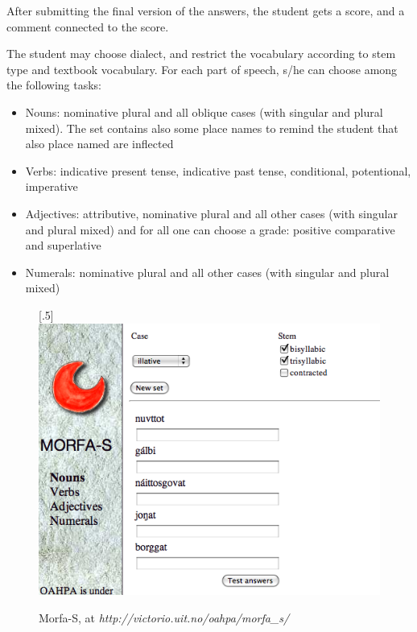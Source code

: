\documentclass[a4paper,12pt]{article}
\begin{document}
After submitting the final version of the answers, the student gets a score, and a comment connected to the score.

The student may choose dialect, and restrict the vocabulary according to stem type and textbook vocabulary. For each part of speech, s/he can choose among the following tasks:
\begin{itemize}
\item Nouns: nominative plural and all oblique cases (with singular and plural mixed). The set contains also some place names to remind the student that also place named are inflected
\item Verbs: indicative present tense, indicative past tense, conditional, potentional, imperative
\item Adjectives: attributive, nominative plural and all other cases (with singular and plural mixed) and for all one can choose a grade: positive comparative and superlative
\item Numerals: nominative plural and all other cases (with singular and plural mixed)
\end{itemize}
\vspace{0.5cm}


\begin{figure}[htbp]
\begin{center}
\scalebox{.5}[.5]{\includegraphics{img/morfaS.png}}\\
\caption{Morfa-S, at \textit{http://victorio.uit.no/oahpa/morfa\_s/}}
\label{morfas}
\end{center}
\end{figure}
\end{document}
